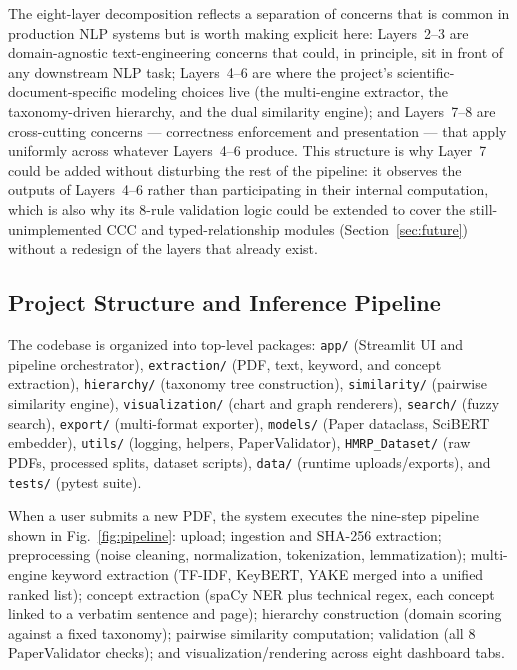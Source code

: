 \documentclass[10pt,conference]{IEEEtran}
\begin{document}
The eight-layer decomposition reflects a separation of concerns that is common in production NLP systems but is worth making explicit here: Layers~2--3 are domain-agnostic text-engineering concerns that could, in principle, sit in front of any downstream NLP task; Layers~4--6 are where the project's scientific-document-specific modeling choices live (the multi-engine extractor, the taxonomy-driven hierarchy, and the dual similarity engine); and Layers~7--8 are cross-cutting concerns --- correctness enforcement and presentation --- that apply uniformly across whatever Layers~4--6 produce. This structure is why Layer~7 could be added without disturbing the rest of the pipeline: it observes the outputs of Layers~4--6 rather than participating in their internal computation, which is also why its 8-rule validation logic could be extended to cover the still-unimplemented CCC and typed-relationship modules (Section~\ref{sec:future}) without a redesign of the layers that already exist.

\subsection{Project Structure and Inference Pipeline}
The codebase is organized into top-level packages: \texttt{app/} (Streamlit UI and pipeline orchestrator), \texttt{extraction/} (PDF, text, keyword, and concept extraction), \texttt{hierarchy/} (taxonomy tree construction), \texttt{similarity/} (pairwise similarity engine), \texttt{visualization/} (chart and graph renderers), \texttt{search/} (fuzzy search), \texttt{export/} (multi-format exporter), \texttt{models/} (Paper dataclass, SciBERT embedder), \texttt{utils/} (logging, helpers, PaperValidator), \texttt{HMRP\_Dataset/} (raw PDFs, processed splits, dataset scripts), \texttt{data/} (runtime uploads/exports), and \texttt{tests/} (pytest suite).

When a user submits a new PDF, the system executes the nine-step pipeline shown in Fig.~\ref{fig:pipeline}: upload; ingestion and SHA-256 extraction; preprocessing (noise cleaning, normalization, tokenization, lemmatization); multi-engine keyword extraction (TF-IDF, KeyBERT, YAKE merged into a unified ranked list); concept extraction (spaCy NER plus technical regex, each concept linked to a verbatim sentence and page); hierarchy construction (domain scoring against a fixed taxonomy); pairwise similarity computation; validation (all 8 PaperValidator checks); and visualization/rendering across eight dashboard tabs.
\end{document}
